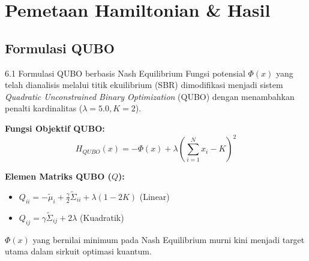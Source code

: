 \section{Pemetaan Hamiltonian \& Hasil}

\begin{frame}
\centering
{}
\end{frame}

\subsection{Formulasi QUBO}
\begin{frame}{6.1 Formulasi QUBO berbasis Nash Equilibrium}
Fungsi potensial $\Phi(x)$ yang telah dianalisis melalui titik ekuilibrium (SBR) dimodifikasi menjadi sistem \textit{Quadratic Unconstrained Binary Optimization} (QUBO) dengan menambahkan penalti kardinalitas ($\lambda=5.0, K=2$).

\textbf{Fungsi Objektif QUBO:}
\begin{equation}
H_{QUBO}(x) = -\Phi(x) + \lambda \left( \sum_{i=1}^N x_i - K \right)^2
\end{equation}

\textbf{Elemen Matriks QUBO ($Q$):}
\begin{itemize}
    \item $Q_{ii} = -\tilde{\mu}_i + \frac{\gamma}{2} \tilde{\Sigma}_{ii} + \lambda (1 - 2K)$ (Linear)
    \item $Q_{ij} = \gamma \tilde{\Sigma}_{ij} + 2\lambda$ (Kuadratik)
\end{itemize}
$\Phi(x)$ yang bernilai minimum pada Nash Equilibrium murni kini menjadi target utama dalam sirkuit optimasi kuantum.
\end{frame}

